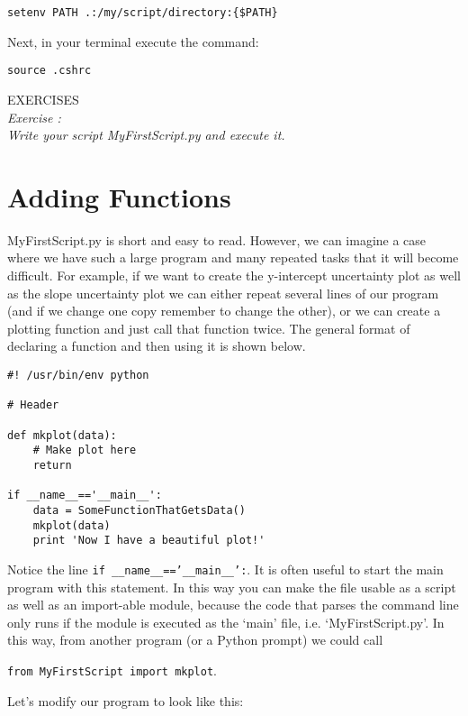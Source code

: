 \texttt{setenv PATH .:/my/script/directory:\{\$PATH\}}

Next, in your terminal execute the command:

\texttt{\termtab source .cshrc}

{\color{blue} {\sf\small EXERCISES}} \\
{\it Exercise  :  \\
  Write your script MyFirstScript.py and execute it.
}

\section{Adding Functions}
\label{s:fun}
MyFirstScript.py is short and easy to read.  However, we can imagine a
case where we have such a large program and many repeated tasks that
it will become difficult.  For example, if we want to create the
y-intercept uncertainty plot as well as the slope uncertainty plot we
can either repeat several lines of our program (and if we change one
copy remember to change the other), or we can create a plotting
function and just call that function twice.  The general format of
declaring a function and then using it is shown below.

\begin{verbatim}
#! /usr/bin/env python

# Header

def mkplot(data): 
    # Make plot here
    return

if __name__=='__main__':
    data = SomeFunctionThatGetsData()
    mkplot(data)
    print 'Now I have a beautiful plot!'
\end{verbatim}

Notice the line \texttt{if \_\_name\_\_=='\_\_main\_\_':}.  It is often useful
to start the main program with this statement.  In this way you can
make the file usable as a script as well as an import-able module,
because the code that parses the command line only runs if the module
is executed as the `main' file, i.e. `MyFirstScript.py'.  In this way,
from another program (or a Python prompt) we could call

\texttt{from MyFirstScript import mkplot}.   

Let's modify our program to look like this:

